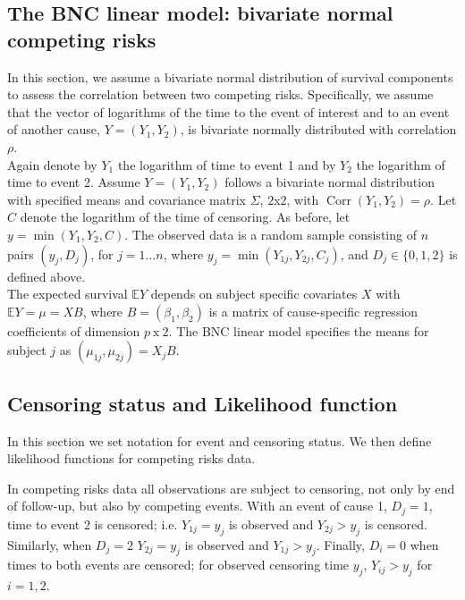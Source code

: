 \documentclass[twoside,a4paper,12pt]{article}
\newcommand{\EE}{\mathbb{E}}
\def\var{\operatorname{Var}}
\def\corr{\operatorname{Corr}}
\theoremstyle{plain}
\theoremstyle{definition}
\begin{document}
\subsection{The BNC linear model: bivariate normal competing risks}

In this section, we assume a bivariate normal distribution of survival 
components to assess the correlation between two competing risks.
Specifically, we assume that the vector of logarithms of the time to the event 
of interest and to an event of another cause, $Y=(Y_1,Y_2)$, is bivariate normally 
distributed with correlation $\rho$. 
\\

Again denote by $Y_1$  the logarithm of time to event 1 and by $Y_2$ the logarithm of 
time to {event 2}. 
Assume $Y=(Y_1,Y_2)$ follows a bivariate normal distribution with specified means and covariance matrix $\Sigma$, $2$x$2$,
with $\corr(Y_1,Y_2)=\rho$. 
Let $C$ denote the logarithm of the time of censoring.
As before, let $y= \min(Y_1,Y_2, C)$.
The observed data is a random sample consisting of $n$ pairs
$(y_j,D_j)$, for ${j=1\ldots n}$,  where 
$y_j=\min(Y_{1j},Y_{2j},C_j)$, and $D_j \in \{0,1,2\}$ {is defined above}. 
\\
The expected survival $\EE Y$  
{depends on subject specific} covariates $X$ 
{with $\EE Y = \mu= X B$, where $B =(\beta_1,\beta_2)$ is a matrix of}
{cause-specific regression coefficients of dimension $p~\text{x}~2$}. 
The BNC linear model specifies the means for subject $j$ as $(\mu_{1j},\mu_{2j}) =X_j B$.




\subsection{Censoring status and Likelihood function}

In this section we set notation for event and censoring status. 
We then define 
likelihood functions for competing risks data. %

In competing risks data all observations are subject to censoring,
not only by end of follow-up, but also by competing events.
With an event of cause 1, $D_j=1$,   time to event 2 is censored; 
i.e. $Y_{1j}=y_j$ is observed and $Y_{2j} > y_j$ is censored. 
Similarly, when $D_j=2$  $Y_{2j}= y_j$ is observed and 
$Y_{1j}> y_j$. 
Finally, $D_i=0$  when times to both events are censored; 
for observed censoring time $y_j$,  $Y_{ij}> y_j$ for $i=1,2$. 
\\
\end{document}
